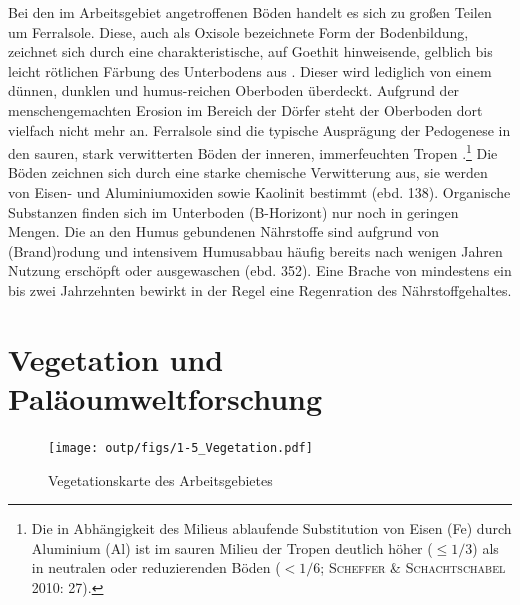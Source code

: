 Bei den im Arbeitsgebiet angetroffenen Böden handelt es sich zu großen Teilen um Ferralsole. Diese, auch als Oxisole bezeichnete Form der Bodenbildung, zeichnet sich durch eine charakteristische, auf Goethit hinweisende, gelblich bis leicht rötlichen Färbung des Unterbodens aus \parencites[351f., 355 Abb.~7.6-4]{Scheffer.2010}[144]{Jones.2013}. Dieser wird lediglich von einem dünnen, dunklen und humus-reichen Oberboden überdeckt. Aufgrund der menschengemachten Erosion im Bereich der Dörfer steht der Oberboden dort vielfach nicht mehr an. Ferralsole sind die typische Ausprägung der Pedogenese in den sauren, stark verwitterten Böden der inneren, immerfeuchten Tropen \parencite[27]{Scheffer.2010}.\footnote{Die in Abhängigkeit des Milieus ablaufende Substitution von Eisen (Fe) durch Aluminium (Al) ist im sauren Milieu der Tropen deutlich höher ($\leq1/3$) als in neutralen oder reduzierenden Böden ($<1/6$; \textsc{Scheffer \& Schachtschabel} 2010: 27).} Die Böden zeichnen sich durch eine starke chemische Verwitterung aus, sie werden von Eisen- und Aluminiumoxiden sowie Kaolinit bestimmt (ebd. 138). Organische Substanzen finden sich im Unterboden (B-Horizont) nur noch in geringen Mengen. Die an den Humus gebundenen Nährstoffe sind aufgrund von (Brand)rodung und intensivem Humusabbau häufig bereits nach wenigen Jahren Nutzung erschöpft oder ausgewaschen (ebd. 352). Eine Brache von mindestens ein bis zwei Jahrzehnten bewirkt in der Regel eine Regenration des Nährstoffgehaltes.


\section{Vegetation und Paläoumweltforschung}\label{sec:Palaeoumwelt}

\begin{figure}[p]
\centering
\texttt{[image: outp/figs/1-5\_Vegetation.pdf]}
\caption{Vegetationskarte des Arbeitsgebietes \parencite[nach][]{Mayaux.2003}}
\label{fig:VegetationKarte}
\end{figure}

